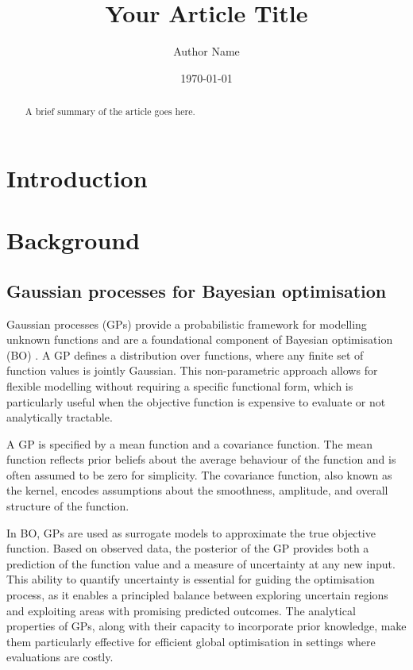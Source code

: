 \documentclass[11pt,a4paper]{article}
\title{Your Article Title}
\author{Author Name}
\date{\today}
\begin{document}
\maketitle

\begin{abstract}
A brief summary of the article goes here.
\end{abstract}

\section{Introduction}


\section{Background}

\subsection{Gaussian processes for Bayesian optimisation}

Gaussian processes (GPs) provide a probabilistic framework for modelling unknown functions and are a foundational component of Bayesian optimisation (BO) \cite{Rasmussen2006Gaussian}.
A GP defines a distribution over functions, where any finite set of function values is jointly Gaussian.
This non-parametric approach allows for flexible modelling without requiring a specific functional form, which is particularly useful when the objective function is expensive to evaluate or not analytically tractable.

A GP is specified by a mean function and a covariance function.
The mean function reflects prior beliefs about the average behaviour of the function and is often assumed to be zero for simplicity.
The covariance function, also known as the kernel, encodes assumptions about the smoothness, amplitude, and overall structure of the function.

In BO, GPs are used as surrogate models to approximate the true objective function.
Based on observed data, the posterior of the GP provides both a prediction of the function value and a measure of uncertainty at any new input. 
This ability to quantify uncertainty is essential for guiding the optimisation process, as it enables a principled balance between exploring uncertain regions and exploiting areas with promising predicted outcomes.
The analytical properties of GPs, along with their capacity to incorporate prior knowledge, make them particularly effective for efficient global optimisation in settings where evaluations are costly.
\end{document}

